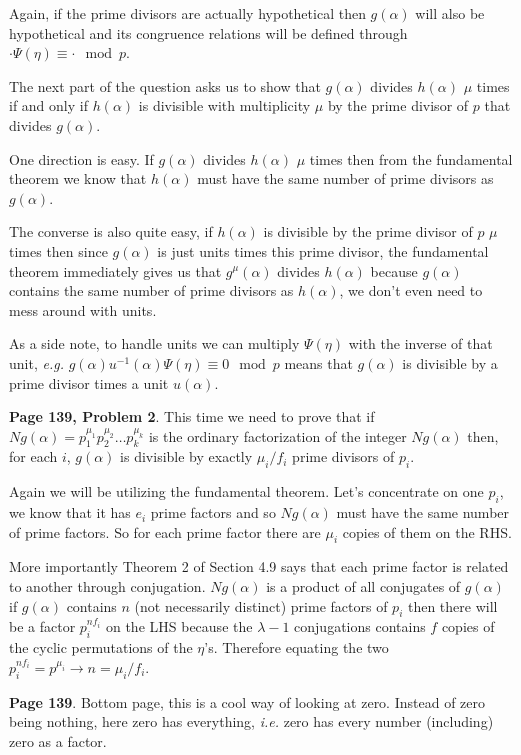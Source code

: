 \documentclass[aps,preprint,preprintnumbers,nofootinbib,showpacs,prd]{revtex4-1}
\newcommand{\ie}{{\it i.e.} }
\newcommand{\eg}{{\it e.g.} }
\begin{document}
Again, if the prime divisors are actually hypothetical then $g(\alpha)$ will also be hypothetical and its congruence relations will be defined through $\cdot \Psi(\eta) \equiv \cdot \mod{p}$.

The next part of the question asks us to show that $g(\alpha)$ divides $h(\alpha)$ $\mu$ times if and only if $h(\alpha)$ is divisible with multiplicity $\mu$ by the prime divisor of $p$ that divides $g(\alpha)$.

One direction is easy. If $g(\alpha)$ divides $h(\alpha)$ $\mu$ times then from the fundamental theorem we know that $h(\alpha)$ must have the same number of prime divisors as $g(\alpha)$.

The converse is also quite easy, if $h(\alpha)$ is divisible by the prime divisor of $p$ $\mu$ times then since $g(\alpha)$ is just units times this prime divisor, the fundamental theorem immediately gives us that $g^\mu(\alpha)$ divides $h(\alpha)$ because $g(\alpha)$ contains the same number of prime divisors as $h(\alpha)$, we don't even need to mess around with units.

As a side note, to handle units we can multiply $\Psi(\eta)$ with the inverse of that unit, \eg $g(\alpha) u^{-1}(\alpha)\Psi(\eta) \equiv 0 \mod{p}$ means that $g(\alpha)$ is divisible by a prime divisor times a unit $u(\alpha)$.

{\bf Page 139, Problem 2}. This time we need to prove that if $Ng(\alpha) = p_1^{\mu_1}p_2^{\mu_2} \dots p_k^{\mu_k}$ is the ordinary factorization of the integer $Ng(\alpha)$ then, for each $i$, $g(\alpha)$ is divisible by exactly $\mu_i/f_i$ prime divisors of $p_i$.

Again we will be utilizing the fundamental theorem. Let's concentrate on one $p_i$, we know that it has $e_i$ prime factors and so $Ng(\alpha)$ must have the same number of prime factors. So for each prime factor there are $\mu_i$ copies of them on the RHS.

More importantly Theorem 2 of Section 4.9 says that each prime factor is related to another through conjugation. $Ng(\alpha)$ is a product of all conjugates of $g(\alpha)$ if $g(\alpha)$ contains $n$ (not necessarily distinct) prime factors of $p_i$ then there will be a factor $p_i^{nf_i}$ on the LHS because the $\lambda - 1$ conjugations contains $f$ copies of the cyclic permutations of the $\eta$'s. Therefore equating the two $p_i^{nf_i} = p^{\mu_i} \to n = \mu_i/f_i$.


{\bf Page 139}. Bottom page, this is a cool way of looking at zero. Instead of zero being nothing, here zero has everything, \ie zero has every number (including) zero as a factor.
\end{document}
